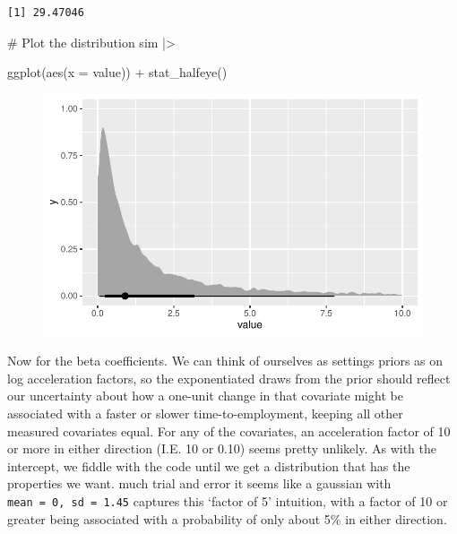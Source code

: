 \documentclass[
  letterpaper,
  DIV=11,
  numbers=noendperiod]{scrreprt}
\newenvironment{Shaded}{\begin{snugshade}}{\end{snugshade}}
\newcommand{\AttributeTok}[1]{\textcolor[rgb]{0.40,0.45,0.13}{#1}}
\newcommand{\CommentTok}[1]{\textcolor[rgb]{0.37,0.37,0.37}{#1}}
\newcommand{\FunctionTok}[1]{\textcolor[rgb]{0.28,0.35,0.67}{#1}}
\newcommand{\NormalTok}[1]{\textcolor[rgb]{0.00,0.23,0.31}{#1}}
\newcommand{\SpecialCharTok}[1]{\textcolor[rgb]{0.37,0.37,0.37}{#1}}
\begin{document}
\begin{verbatim}
[1] 29.47046
\end{verbatim}

\begin{Shaded}
\begin{Highlighting}[]
\CommentTok{\# Plot the distribution}
\NormalTok{sim }\SpecialCharTok{|\textgreater{}}

    \FunctionTok{ggplot}\NormalTok{(}\FunctionTok{aes}\NormalTok{(}\AttributeTok{x =}\NormalTok{ value)) }\SpecialCharTok{+}
    \FunctionTok{stat\_halfeye}\NormalTok{()  }
\end{Highlighting}
\end{Shaded}

\begin{figure}[H]

{\centering \includegraphics{./bayesian-cfa_files/figure-pdf/unnamed-chunk-25-1.pdf}

}

\end{figure}

Now for the beta coefficients. We can think of ourselves as settings
priors as on log acceleration factors, so the exponentiated draws from
the prior should reflect our uncertainty about how a one-unit change in
that covariate might be associated with a faster or slower
time-to-employment, keeping all other measured covariates equal. For any
of the covariates, an acceleration factor of 10 or more in either
direction (I.E. 10 or 0.10) seems pretty unlikely. As with the
intercept, we fiddle with the code until we get a distribution that has
the properties we want. much trial and error it seems like a gaussian
with \texttt{mean\ =\ 0,\ sd\ =\ 1.45} captures this `factor of 5'
intuition, with a factor of 10 or greater being associated with a
probability of only about 5\% in either direction.
\end{document}
